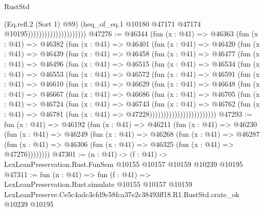 \begin{lexlean}{RustStd}
\begin{coremodule}
                                            (Eq.refl.{2} (Sort 1) @89)
                                            (heq_of_eq.{1}
                                              @10180
                                              @47171
                                              @47174
                                              @10195)))))))))))))))))))))
@47276 := @46344
    (fun (x : @41) =>
    @46363
      (fun (x : @41) =>
      @46382
        (fun (x : @41) =>
        @46401
          (fun (x : @41) =>
          @46420
            (fun (x : @41) =>
            @46439
              (fun (x : @41) =>
              @46458
                (fun (x : @41) =>
                @46477
                  (fun (x : @41) =>
                  @46496
                    (fun (x : @41) =>
                    @46515
                      (fun (x : @41) =>
                      @46534
                        (fun (x : @41) =>
                        @46553
                          (fun (x : @41) =>
                          @46572
                            (fun (x : @41) =>
                            @46591
                              (fun (x : @41) =>
                              @46610
                                (fun (x : @41) =>
                                @46629
                                  (fun (x : @41) =>
                                  @46648
                                    (fun (x : @41) =>
                                    @46667
                                      (fun (x : @41) =>
                                      @46686
                                        (fun (x : @41) =>
                                        @46705
                                          (fun (x : @41) =>
                                          @46724
                                            (fun (x : @41) =>
                                            @46743
                                              (fun (x : @41) =>
                                              @46762
                                                (fun (x : @41) =>
                                                @46781
                                                  (fun (x : @41) => @47228))))))))))))))))))))))))
@47293 := fun (x : @41) =>
  @46192
    (fun (x : @41) =>
    @46211
      (fun (x : @41) =>
      @46230
        (fun (x : @41) =>
        @46249
          (fun (x : @41) =>
          @46268
            (fun (x : @41) =>
            @46287
              (fun (x : @41) => @46306 (fun (x : @41) => @46325 (fun (x : @41) => @47276))))))))
@47301 := (n : @41) ->
  (f : @41) -> LexLeanPreservation.Rust.FunSem @10155 @10157 @10159 @10239 @10195
@47311 := fun (n : @41) =>
  fun (f : @41) =>
  LexLeanPreservation.Rust.simulate
    @10155
    @10157
    @10159
    LexLeanPreserve.Ce5c4adc3cfd9c58fca37e2c38493ff18.R1.RustStd.crate_ok
    @10239
    @10195
\end{coremodule}
\end{lexlean}
